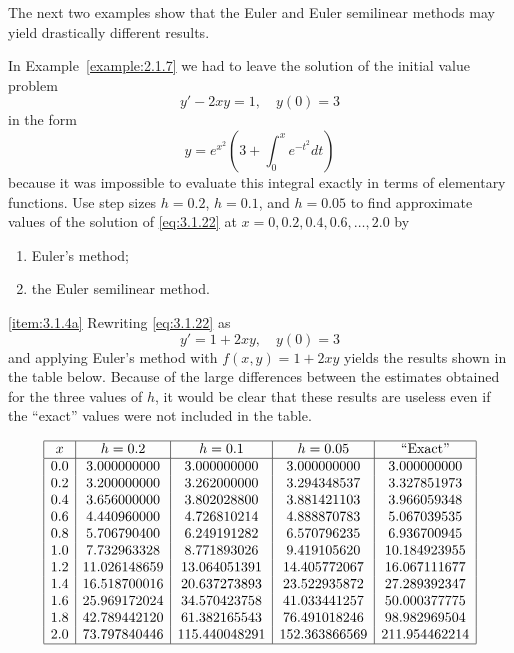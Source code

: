 \documentclass{ximera}
\begin{document}
The next two examples show that the Euler and Euler semilinear
methods may yield drastically different results.

\begin{example}\label{example:3.1.4}
In Example~\ref{example:2.1.7} we had to leave the solution of the initial
value
problem
\begin{equation} \label{eq:3.1.22}
y'-2xy=1,\quad y(0)=3
\end{equation}
in the  form
\begin{equation} \label{eq:3.1.23}
y=e^{x^2}\left(3 +\int^x_0 e^{-t^2}dt\right)
\end{equation}
because it was impossible to evaluate this integral exactly in terms
of elementary functions.
Use step sizes $h=0.2$, $h=0.1$, and $h=0.05$ to find approximate
values
of the solution of \eqref{eq:3.1.22} at $x=0, 0.2, 0.4, 0.6,
\dots, 2.0$ by
\begin{enumerate}
\item\label{item:3.1.4a} Euler's method;   
\item\label{item:3.1.4b} the Euler semilinear method.
\end{enumerate}



\begin{explanation}
\ref{item:3.1.4a}
Rewriting \eqref{eq:3.1.22} as
\begin{equation} \label{eq:3.1.24}
y'=1+2xy,\quad y(0)=3
\end{equation}
and applying Euler's method with $f(x,y)=1+2xy$ yields the results
shown in the table below. Because of the large differences
between the estimates obtained for the three values of $h$, it
would be clear that these results are useless even if the ``exact''
values were not included in the table.

$$
\begin{array}{|c|c|c|c|c|}
\hline
x&
h=0.2&
h=0.1&
h=0.05&
\text{``Exact''}\\ \hline
0.0 &  3.000000000 & 3.000000000 & 3.000000000     &   3.000000000 \\
0.2 &  3.200000000 & 3.262000000 &3.294348537      &   3.327851973 \\
0.4 &  3.656000000 & 3.802028800 & 3.881421103     &   3.966059348 \\
0.6 &  4.440960000 & 4.726810214 & 4.888870783     &   5.067039535 \\
0.8 &  5.706790400 & 6.249191282 & 6.570796235     &   6.936700945 \\
1.0 &  7.732963328 & 8.771893026 & 9.419105620     &  10.184923955 \\
1.2 & 11.026148659 &13.064051391 &14.405772067     &  16.067111677 \\
1.4 & 16.518700016 &20.637273893 & 23.522935872    &  27.289392347 \\
1.6 & 25.969172024 &34.570423758 & 41.033441257    &  50.000377775 \\
1.8 & 42.789442120 &61.382165543 & 76.491018246    &  98.982969504 \\
2.0 & 73.797840446 & 115.440048291 & 152.363866569 & 211.954462214 \\
\hline
\end{array}
$$



\end{explanation}
\end{example}
\end{document}
